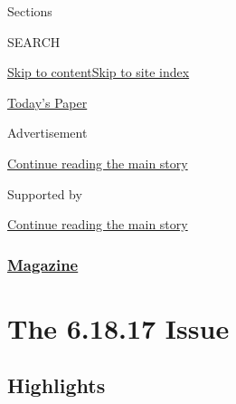 Sections

SEARCH

\protect\hyperlink{site-content}{Skip to
content}\protect\hyperlink{site-index}{Skip to site index}

\href{https://myaccount.nytimes3xbfgragh.onion/auth/login?response_type=cookie\&client_id=vi}{}

\href{https://www.nytimes3xbfgragh.onion/section/todayspaper}{Today's
Paper}

Advertisement

\protect\hyperlink{after-top}{Continue reading the main story}

Supported by

\protect\hyperlink{after-sponsor}{Continue reading the main story}

\hypertarget{magazine}{%
\subsubsection{\texorpdfstring{\href{/section/magazine}{Magazine}}{Magazine}}\label{magazine}}

\hypertarget{the-61817-issue}{%
\section{The 6.18.17 Issue}\label{the-61817-issue}}

\hypertarget{highlights}{%
\subsection{Highlights}\label{highlights}}

